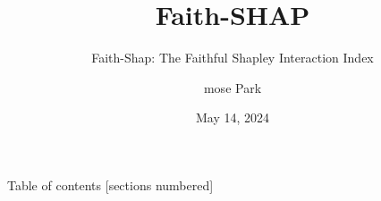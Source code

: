 \documentclass[10pt]{beamer}
\title{Faith-SHAP}
\subtitle{Faith-Shap: The Faithful Shapley Interaction Index}
\date{May 14, 2024}
\author{mose Park}
\institute{    Department of Statistical Data Science \\
    University of Seoul}
\begin{document}
\maketitle

\begin{frame}{Table of contents}
  [sections numbered]
  \tableofcontents%
\end{frame}
\end{document}
